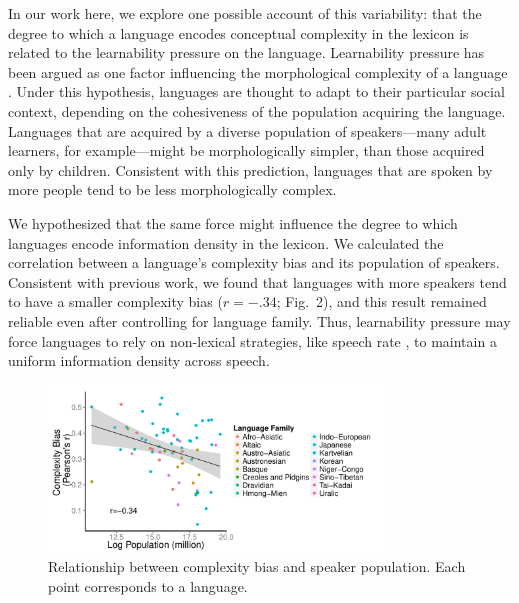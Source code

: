 \documentclass{evolang11}
\begin{document}
In our work here, we explore one possible account of this variability: that the degree to which a language encodes conceptual complexity in the lexicon is related to the learnability pressure on the language. Learnability pressure has been argued as one factor influencing the morphological complexity of a language \cite{lupyan2010language}. Under this hypothesis, languages are thought to adapt to their particular social context, depending on the cohesiveness of the population acquiring the language. Languages that are  acquired by a diverse population of speakers---many adult learners, for example---might be morphologically simpler, than those acquired only by children. Consistent with this prediction, languages that are spoken by more people tend to be less morphologically complex.

We hypothesized that the same force might influence the degree to which languages encode information density in the lexicon. We calculated the correlation between a language's complexity bias and its population of speakers. Consistent with previous work, we found that languages with more speakers tend to have a smaller complexity bias ($r = -.34$;  Fig.\ 2), and this result remained reliable even after controlling for language family. Thus, learnability pressure may force languages to rely on non-lexical strategies, like speech rate \cite{pellegrino2011across}, to maintain a uniform information density across speech.


\begin{figure}
\includegraphics[width=3.5in]{Fig2.pdf}
\caption{Relationship between complexity bias and speaker population. Each point corresponds to a language. \label{fig2}}
\end{figure}







{\footnotesize  }
\end{document}
